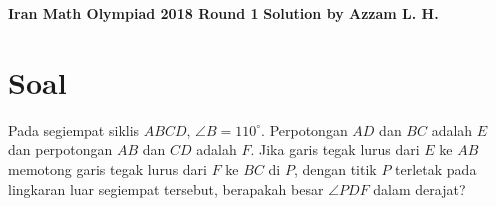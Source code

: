 \begin{center}
    \textbf{\Huge Iran Math Olympiad 2018 Round 1}
    \textbf{\large Solution by Azzam L. H.}
\end{center}

\section{Soal} 
Pada segiempat siklis $ABCD$, $\angle B = 110^{\circ}$. Perpotongan $AD$ dan $BC$ adalah $E$ dan perpotongan $AB$ dan $CD$ adalah $F$. Jika garis tegak lurus dari $E$ ke $AB$ memotong garis tegak lurus dari $F$ ke $BC$ di $P$, dengan titik $P$ terletak pada lingkaran luar segiempat tersebut, berapakah besar $\angle PDF$ dalam derajat?



